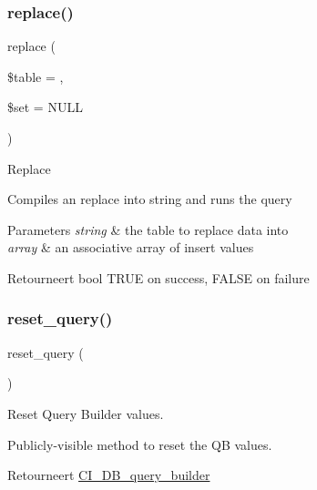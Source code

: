 \subsubsection{\texorpdfstring{replace()}{replace()}}
{\footnotesize\ttfamily replace (\begin{DoxyParamCaption}\item[{}]{\$table = {\ttfamily \textquotesingle{}\textquotesingle{}},  }\item[{}]{\$set = {\ttfamily NULL} }\end{DoxyParamCaption})}

Replace

Compiles an replace into string and runs the query


\begin{DoxyParams}{Parameters}
{\em string} & the table to replace data into \\
\hline
{\em array} & an associative array of insert values \\
\hline
\end{DoxyParams}
\begin{DoxyReturn}{Retourneert}
bool T\+R\+UE on success, F\+A\+L\+SE on failure 
\end{DoxyReturn}
\mbox{\label{class_c_i___d_b__query__builder_a66636a017a1115d983424cdfca677ddf}} 
\subsubsection{\texorpdfstring{reset\_query()}{reset\_query()}}
{\footnotesize\ttfamily reset\+\_\+query (\begin{DoxyParamCaption}{ }\end{DoxyParamCaption})}

Reset Query Builder values.

Publicly-\/visible method to reset the QB values.

\begin{DoxyReturn}{Retourneert}
\mbox{\hyperlink{class_c_i___d_b__query__builder}{C\+I\+\_\+\+D\+B\+\_\+query\+\_\+builder}} 
\end{DoxyReturn}
\mbox{\label{class_c_i___d_b__query__builder_a406a7ea81e717e56496f61baf3e03f44}} 

